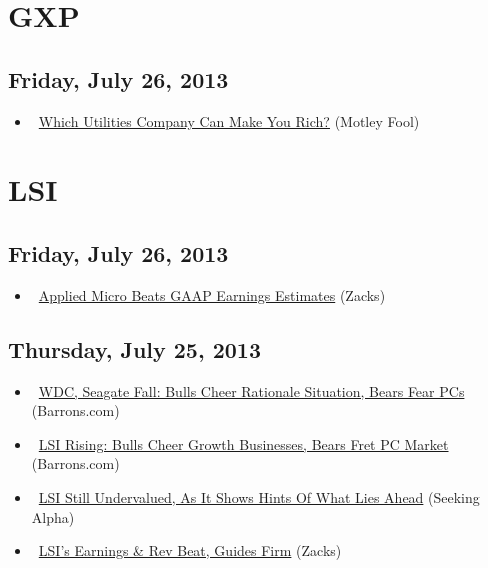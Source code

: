 \documentclass[11pt,asymmetric]{article}
\begin{document}
\section*{GXP}

\subsection*{Friday, July 26, 2013}
\begin{itemize}
\item\ \href{http://beta.fool.com/paulinasheker/2013/07/26/which-utilities-can-make-you-rich/41337/?source=eogyholnk0000001}{Which Utilities Company Can Make You Rich?} (Motley Fool)
\end{itemize}

\section*{LSI}

\subsection*{Friday, July 26, 2013}
\begin{itemize}
\item\ \href{http://finance.yahoo.com/news/applied-micro-beats-gaap-earnings-132004301.html}{Applied Micro Beats GAAP Earnings Estimates} (Zacks)
\end{itemize}
\subsection*{Thursday, July 25, 2013}
\begin{itemize}
\item\ \href{http://blogs.barrons.com/techtraderdaily/2013/07/25/wdc-seagate-fall-bulls-cheer-rationale-situation-bears-fear-pcs/?mod=yahoobarrons}{WDC, Seagate Fall: Bulls Cheer Rationale Situation, Bears Fear PCs} (Barrons.com)
\item\ \href{http://blogs.barrons.com/techtraderdaily/2013/07/25/lsi-rising-bulls-cheer-growth-businesses-bears-fret-pc-market/?mod=yahoobarrons}{LSI Rising: Bulls Cheer Growth Businesses, Bears Fret PC Market} (Barrons.com)
\item\ \href{http://seekingalpha.com/article/1571862-lsi-still-undervalued-as-it-shows-hints-of-what-lies-ahead?source=yahoo}{LSI Still Undervalued, As It Shows Hints Of What Lies Ahead} (Seeking Alpha)
\item\ \href{http://finance.yahoo.com/news/lsis-earnings-rev-beat-guides-123002050.html}{LSI's Earnings \& Rev Beat, Guides Firm} (Zacks)
\end{itemize}
\end{document}
